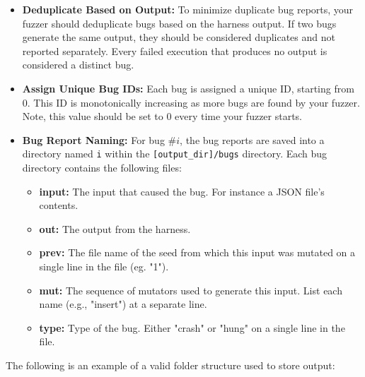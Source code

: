 \documentclass[letterpaper,11pt]{article}
\begin{document}
\begin{itemize}
    \item \textbf{Deduplicate Based on Output:} To minimize duplicate bug reports, your fuzzer should deduplicate bugs based on the harness output. If two bugs generate the same output, they should be considered duplicates and not reported separately. Every failed execution that produces no output is considered a distinct bug.
    \item \textbf{Assign Unique Bug IDs:} Each bug is assigned a unique ID, starting from 0. This ID is monotonically increasing as more bugs are found by your fuzzer. Note, this value should be set to 0 every time your fuzzer starts.

    \item \textbf{Bug Report Naming:} For bug $\#i$, the bug reports are saved into a directory named \texttt{i} within the \texttt{[output\_dir]/bugs} directory. Each bug directory contains the following files:
    \begin{itemize}
        \item \textbf{input:} The input that caused the bug. For instance a JSON file's contents.
        \item \textbf{out:} The output from the harness.
        \item \textbf{prev:} The file name of the seed from which this input was mutated on a single line in the file (eg. "1").
        \item \textbf{mut:} The sequence of mutators used to generate this input. List each name (e.g., "insert") at a separate line.
        \item \textbf{type:} Type of the bug. Either "crash" or "hung" on a single line in the file.
    \end{itemize}
\end{itemize}

 The following is an example of a valid folder structure used to store output:


\end{document}
